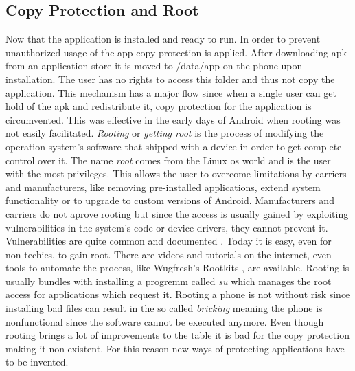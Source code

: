 \subsection{Copy Protection and Root} \label{subsection:android-copyroot}
Now that the application is installed and ready to run.
In order to prevent unauthorized usage of the app copy protection is applied.
After downloading \gls{apk} from an application store it is moved to /data/app on the phone upon installation.
The user has no rights to access this folder and thus not copy the application.
This mechanism has a major flow since when a single user can get hold of the \gls{apk} and redistribute it, copy protection for the application is circumvented.
This was effective in the early days of Android when rooting was not easily facilitated.
\newline
\textit{Rooting} or \textit{getting root} is the process of modifying the operation system's software that shipped with a device in order to get complete control over it.
The name \textit{root} comes from the Linux \gls{os} world and is the user with the most privileges.
This allows the user to overcome limitations by carriers and manufacturers, like removing pre-installed applications, extend system functionality or to upgrade to custom versions of Android.
Manufacturers and carriers do not aprove rooting but since the access is usually gained by exploiting vulnerabilities in the system's code or device drivers, they cannot prevent it.
Vulnerabilities are quite common and documented \cite{androidVulnerabilities}.
Today it is easy, even for non-techies, to gain root.
There are videos and tutorials on the internet, even tools to automate the process, like Wugfresh's Rootkits \cite{wugfresh}, are available.
Rooting is usually bundles with installing a progremm called \textit{su} which manages the root access for applications which request it.
Rooting a phone is not without risk since installing bad files can result in the so called \textit{bricking} meaning the phone is nonfunctional since the software cannot be executed anymore.\cite{androidpoliceRoot}
\newline
Even though rooting brings a lot of improvements to the table it is bad for the copy protection making it non-existent. For this reason new ways of protecting applications have to be invented.
